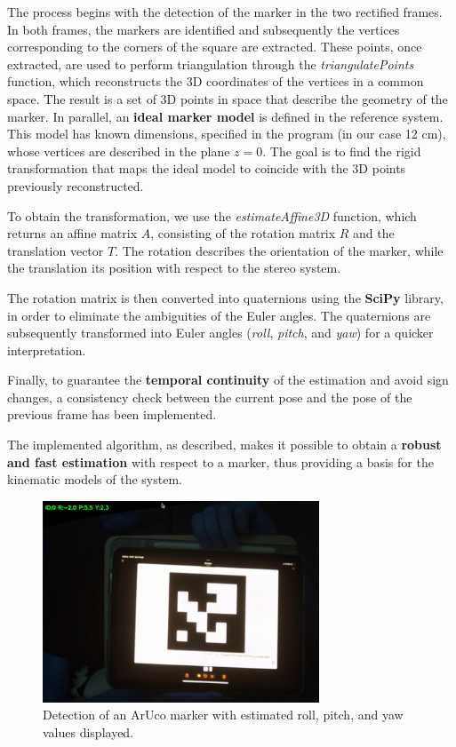 The process begins with the detection of the marker in the two rectified frames. In both frames, the markers are identified and subsequently the vertices corresponding to the corners of the square are extracted. These points, once extracted, are used to perform triangulation through the \textit{triangulatePoints} function, which reconstructs the 3D coordinates of the vertices in a common space. The result is a set of 3D points in space that describe the geometry of the marker.
In parallel, an \textbf{ideal marker model} is defined in the reference system. This model has known dimensions, specified in the program (in our case 12 cm), whose vertices are described in the plane \(z = 0\). The goal is to find the rigid transformation that maps the ideal model to coincide with the 3D points previously reconstructed. 

To obtain the transformation, we use the \textit{estimateAffine3D} function, which returns an affine matrix \(A\), consisting of the rotation matrix \(R\) and the translation vector \(T\). The rotation describes the orientation of the marker, while the translation its position with respect to the stereo system.  

The rotation matrix is then converted into quaternions using the \textbf{SciPy} library, in order to eliminate the ambiguities of the Euler angles. The quaternions are subsequently transformed into Euler angles (\textit{roll}, \textit{pitch}, and \textit{yaw}) for a quicker interpretation.  

Finally, to guarantee the \textbf{temporal continuity} of the estimation and avoid sign changes, a consistency check between the current pose and the pose of the previous frame has been implemented.  

The implemented algorithm, as described, makes it possible to obtain a \textbf{robust and fast estimation} with respect to a marker, thus providing a basis for the kinematic models of the system.

\begin{figure}[ht]
  \centering
  \includegraphics[height=6cm]{images/roll_pitch_yaw.png}
  \caption{Detection of an ArUco marker with estimated roll, pitch, and yaw values displayed.}
\end{figure}

